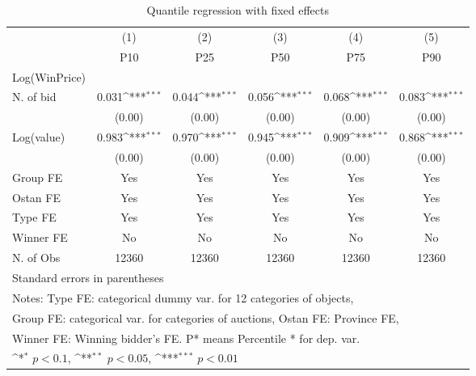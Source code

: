 {
\def\sym#1{\ifmmode^{#1}\else\(^{#1}\)\fi}
\begin{longtable}{l*{5}{c}}
\caption{Quantile regression with fixed effects \label{reg3}}\\
\toprule\endfirsthead\midrule\endhead\midrule\endfoot\endlastfoot
                &\multicolumn{1}{c}{(1)}&\multicolumn{1}{c}{(2)}&\multicolumn{1}{c}{(3)}&\multicolumn{1}{c}{(4)}&\multicolumn{1}{c}{(5)}\\
                &\multicolumn{1}{c}{P10}&\multicolumn{1}{c}{P25}&\multicolumn{1}{c}{P50}&\multicolumn{1}{c}{P75}&\multicolumn{1}{c}{P90}\\
Log(WinPrice)   &                  &                  &                  &                  &                  \\
\midrule
N. of bid       &    0.031\sym{***}&    0.044\sym{***}&    0.056\sym{***}&    0.068\sym{***}&    0.083\sym{***}\\
                &   (0.00)         &   (0.00)         &   (0.00)         &   (0.00)         &   (0.00)         \\
Log(value)      &    0.983\sym{***}&    0.970\sym{***}&    0.945\sym{***}&    0.909\sym{***}&    0.868\sym{***}\\
                &   (0.00)         &   (0.00)         &   (0.00)         &   (0.00)         &   (0.00)         \\
\midrule
Group FE        &      Yes         &      Yes         &      Yes         &      Yes         &      Yes         \\
Ostan FE        &      Yes         &      Yes         &      Yes         &      Yes         &      Yes         \\
Type FE         &      Yes         &      Yes         &      Yes         &      Yes         &      Yes         \\
Winner FE       &       No         &       No         &       No         &       No         &       No         \\
N. of Obs       &    12360         &    12360         &    12360         &    12360         &    12360         \\
\bottomrule
\multicolumn{6}{l}{\footnotesize Standard errors in parentheses}\\
\multicolumn{6}{l}{\footnotesize Notes: Type FE: categorical dummy var. for 12 categories of objects,}\\
\multicolumn{6}{l}{\footnotesize Group FE: categorical var. for categories of auctions, Ostan FE: Province FE,}\\
\multicolumn{6}{l}{\footnotesize Winner FE: Winning bidder's FE. P* means Percentile * for dep. var.}\\
\multicolumn{6}{l}{\footnotesize \sym{*} \(p<0.1\), \sym{**} \(p<0.05\), \sym{***} \(p<0.01\)}\\
\end{longtable}
}
